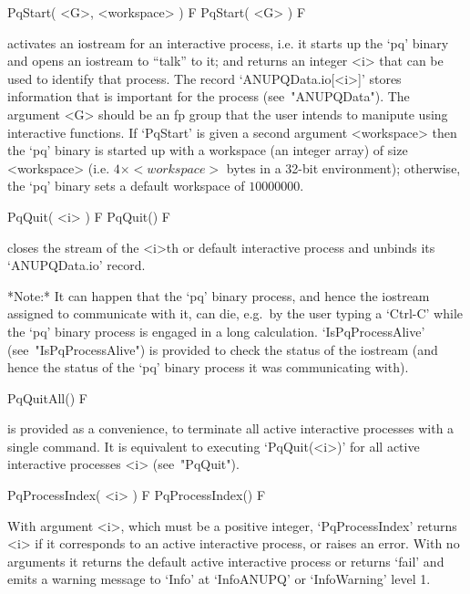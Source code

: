 
\>PqStart( <G>, <workspace> ) F
\>PqStart( <G> ) F

activates an iostream for an interactive {\ANUPQ} process, i.e. it starts
up the `pq' binary and opens an iostream to ``talk'' to it;  and  returns
an integer <i> that can be used to  identify  that  process.  The  record
`ANUPQData.io[<i>]' stores information that is important for the  process
(see~"ANUPQData"). The argument <G> should be an fp group that  the  user
intends to manipute using interactive {\ANUPQ} functions. If `PqStart' is
given a second argument <workspace> then the `pq' binary  is  started  up
with a workspace (an integer array) of size <workspace> (i.e.  $4  \times
<workspace>$ bytes in a 32-bit environment); otherwise, the  `pq'  binary
sets a default workspace of $10000000$.

\>PqQuit( <i> ) F
\>PqQuit() F

closes the stream of the <i>th or default  interactive  {\ANUPQ}  process
and unbinds its `ANUPQData.io' record.

*Note:*
It can happen that the `pq' binary process, and hence the {\GAP} iostream
assigned to communicate with it, can  die,  e.g.~by  the  user  typing  a
`Ctrl-C' while the `pq' binary process is engaged in a long  calculation.
`IsPqProcessAlive' (see~"IsPqProcessAlive")  is  provided  to  check  the
status of the {\GAP} iostream (and hence the status of  the  `pq'  binary
process it was communicating with).

\>PqQuitAll() F

is provided  as  a  convenience,  to  terminate  all  active  interactive
{\ANUPQ} processes with a single command. It is equivalent  to  executing
`PqQuit(<i>)'  for  all  active  interactive   {\ANUPQ}   processes   <i>
(see~"PqQuit").


\>PqProcessIndex( <i> ) F
\>PqProcessIndex() F

With argument <i>, which must be  a  positive  integer,  `PqProcessIndex'
returns <i> if it corresponds to an active interactive process, or raises
an error. With no arguments it returns  the  default  active  interactive
process or returns `fail' and  emits  a  warning  message  to  `Info'  at
`InfoANUPQ' or `InfoWarning' level 1.

